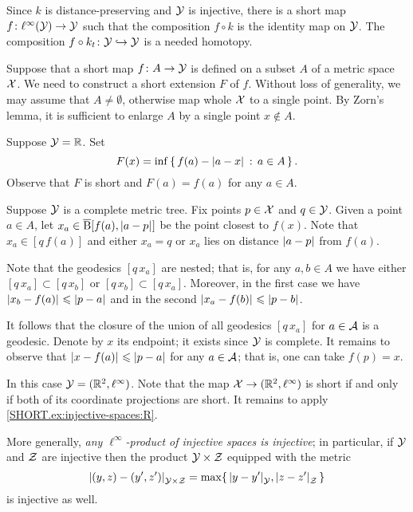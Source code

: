 Since $k$ is distance-preserving and $\mathcal{Y}$ is injective,
there is a short map $f\colon\ell^\infty(\mathcal{Y})\to \mathcal{Y}$ such that the composition $f\circ k$ is the identity map on $\mathcal{Y}$.
The composition $f\circ k_t\colon\mathcal{Y}\hookrightarrow \mathcal{Y}$ is a needed homotopy. 

Suppose that a short map $f\colon A\to\mathcal{Y}$ is defined on a subset $A$ of a metric space $\mathcal{X}$.
We need to construct a short extension $F$ of $f$.
Without loss of generality, we may assume that $A\ne\emptyset$, otherwise map whole $\mathcal{X}$ to a single point.
By Zorn's lemma, it is sufficient to enlarge $A$ by a single point $x\notin A$.

Suppose $\mathcal{Y}=\mathbb{R}$.
Set 
\[F(x)=\inf\set{f(a)-\dist{a}{x}{}}{a\in A}.\] 
Observe that $F$ is short and $F(a)=f(a)$ for any $a\in A$.

Suppose  $\mathcal{Y}$ is a complete metric tree.
Fix points $p\in \mathcal{X}$ and $q\in\mathcal{Y}$.
Given a point $a\in A$,
let $x_a\in\cBall[f(a),\dist{a}{p}{}]$ be the point closest to $f(x)$.
Note that $x_a\in[q\,f(a)]$ and either $x_a=q$ or $x_a$ lies on distance $\dist{a}{p}{}$ from $f(a)$.

Note that the geodesics $[q\,x_a]$ are nested;
that is, for any $a,b\in A$ we have either $[q\,x_a]\subset [q\,x_b]$ or $[q\,x_b]\subset [q\,x_a]$.
Moreover, in the first case we have $\dist{x_b}{f(a)}{}\le \dist{p}{a}{}$ and in the second $\dist{x_a}{f(b)}{}\le \dist{p}{b}{}$.

It follows that the closure of the union of all geodesics $[q\,x_a]$ for $a\in\mathcal{A}$ is a geodesic.
Denote by $x$ its endpoint; it exists since $\mathcal{Y}$ is complete.
It remains to observe that $\dist{x}{f(a)}{}\le \dist{p}{a}{}$ for any $a\in\mathcal{A}$;
that is, one can take $f(p)=x$.

In this case $\mathcal{Y}=(\mathbb{R}^2,\ell^\infty)$.
Note that the map $\mathcal{X}\to (\mathbb{R}^2,\ell^\infty)$ is short if and only if both of its coordinate projections are short.
It remains to apply \ref{SHORT.ex:injective-spaces:R}.

More generally, \emph{any $\ell^\infty$-product of injective spaces is injective};
in particular, if $\mathcal{Y}$ and $\mathcal{Z}$ are injective then the product $\mathcal{Y}\times\mathcal{Z}$ equipped with the metric 
\[\dist{(y,z)}{(y',z')}{\spc{Y}\times\spc{Z}}=\max\{\,\dist{y}{y'}{\spc{Y}},\dist{z}{z'}{\spc{Z}}\,\}\]
is injective as well.


